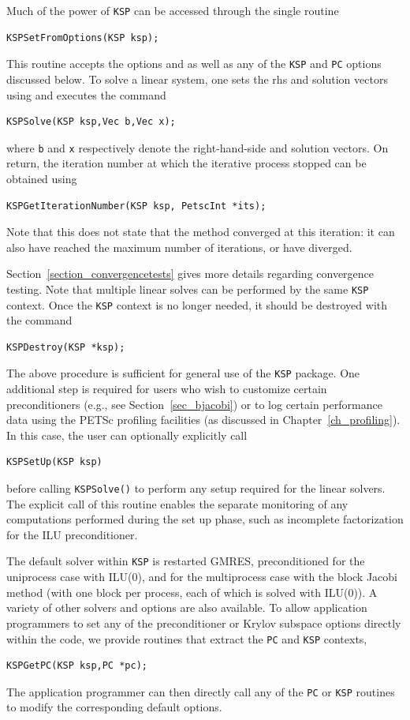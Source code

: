 Much of the power of \lstinline{KSP} can be accessed through the single routine
\begin{lstlisting}
KSPSetFromOptions(KSP ksp);
\end{lstlisting}
This
routine accepts the options  and  as well as
any of the \lstinline{KSP} and \lstinline{PC} options discussed below.
To solve a linear system, one sets the rhs and solution vectors using
and executes the
command
\begin{lstlisting}
KSPSolve(KSP ksp,Vec b,Vec x);
\end{lstlisting}
where \lstinline{b} and \lstinline{x} respectively denote the right-hand-side and
solution vectors.  On return, the iteration number at which
the iterative process stopped
can be obtained using
\begin{lstlisting}
KSPGetIterationNumber(KSP ksp, PetscInt *its);
\end{lstlisting}
Note that this does not state that the method converged at this
iteration: it can also have reached the maximum number of iterations,
or have diverged.

Section~\ref{section_convergencetests} gives more details regarding
convergence testing. Note that multiple linear solves can be performed by
the same \lstinline{KSP} context. Once the \lstinline{KSP} context is no longer needed, it should be
destroyed with the command
\begin{lstlisting}
KSPDestroy(KSP *ksp);
\end{lstlisting}

The above procedure is sufficient for general use of the \lstinline{KSP} package.
One additional step is required for users who wish to customize certain
preconditioners (e.g., see Section~\ref{sec_bjacobi}) or to log certain
performance data using the PETSc profiling facilities (as discussed in
Chapter~\ref{ch_profiling}).
In this case, the user can optionally explicitly call
\begin{lstlisting}
KSPSetUp(KSP ksp)
\end{lstlisting}
before calling \lstinline{KSPSolve()} to perform any setup required for
the linear solvers.  The explicit call of this routine enables the
separate monitoring of any computations performed during the set up
phase, such as incomplete factorization for the ILU preconditioner.

The default solver within \lstinline{KSP} is restarted GMRES, preconditioned for
the uniprocess case with ILU(0), and for the multiprocess case
with the block Jacobi method (with one block per process, each of
which is solved with ILU(0)). A variety of other solvers
and options are also available.
To allow application programmers to set any of the preconditioner or
Krylov subspace options directly within the code, we provide routines
that extract the \lstinline{PC} and \lstinline{KSP} contexts,
\begin{lstlisting}
KSPGetPC(KSP ksp,PC *pc);
\end{lstlisting}
The application programmer can then directly call any of the \lstinline{PC} or \lstinline{KSP}
routines to modify the corresponding default options.

